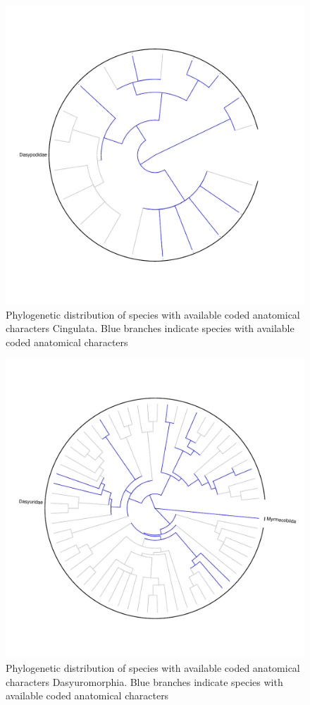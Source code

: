 \documentclass[12pt,letterpaper]{article}
\begin{document}
\begin{figure}[!htbp]
\centering
    \includegraphics[width=1\textwidth]{Supp_figure_CINGULATA.pdf}
\caption{Phylogenetic distribution of species with available coded anatomical characters Cingulata. Blue branches indicate species with available coded anatomical characters}
\label{Supp_Figure_Phylo-Cingulata}
\end{figure}

\begin{figure}[!htbp]
\centering
    \includegraphics[width=1\textwidth]{Supp_figure_DASYUROMORPHIA.pdf}
\caption{Phylogenetic distribution of species with available coded anatomical characters Dasyuromorphia. Blue branches indicate species with available coded anatomical characters}
\label{Supp_Figure_Phylo-Dasyuromorphia}
\end{figure}
\end{document}
